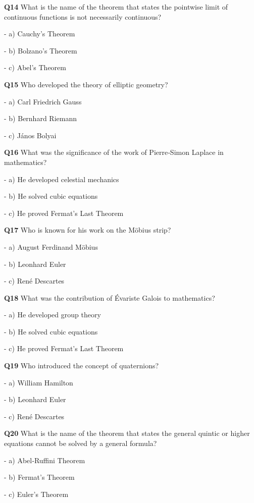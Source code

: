 \textbf{Q14} What is the name of the theorem that states the pointwise limit of continuous functions is not necessarily continuous?\par
\quad - a) Cauchy's Theorem\par
\quad - b) Bolzano's Theorem\par
\quad - c) Abel's Theorem\par

\textbf{Q15} Who developed the theory of elliptic geometry?\par
\quad - a) Carl Friedrich Gauss\par
\quad - b) Bernhard Riemann\par
\quad - c) János Bolyai\par

\textbf{Q16} What was the significance of the work of Pierre‑Simon Laplace in mathematics?\par
\quad - a) He developed celestial mechanics\par
\quad - b) He solved cubic equations\par
\quad - c) He proved Fermat's Last Theorem\par

\textbf{Q17} Who is known for his work on the Möbius strip?\par
\quad - a) August Ferdinand Möbius\par
\quad - b) Leonhard Euler\par
\quad - c) René Descartes\par

\textbf{Q18} What was the contribution of Évariste Galois to mathematics?\par
\quad - a) He developed group theory\par
\quad - b) He solved cubic equations\par
\quad - c) He proved Fermat's Last Theorem\par

\textbf{Q19} Who introduced the concept of quaternions?\par
\quad - a) William Hamilton\par
\quad - b) Leonhard Euler\par
\quad - c) René Descartes\par

\textbf{Q20} What is the name of the theorem that states the general quintic or higher equations cannot be solved by a general formula?\par
\quad - a) Abel‑Ruffini Theorem\par
\quad - b) Fermat's Theorem\par
\quad - c) Euler's Theorem\par

